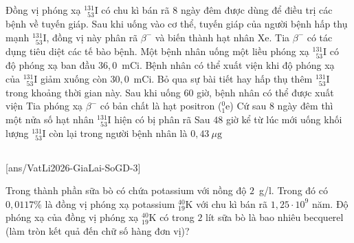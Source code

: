 	\begin{ex}%
		Đồng vị phóng xạ ${}^{131}_{\phantom{1}53}\text{I}$ có chu kì bán rã $8$ ngày đêm được dùng để điều trị các bệnh về tuyến giáp. Sau khi uống vào cơ thể, tuyến giáp của người bệnh hấp thụ mạnh ${}^{131}_{\phantom{1}53}\text{I}$, đồng vị này phân rã $\beta^-$ và biến thành hạt nhân Xe. Tia $\beta^-$ có tác dụng tiêu diệt các tế bào bệnh. Một bệnh nhân uống một liều phóng xạ ${}^{131}_{\phantom{1}53}\text{I}$ có độ phóng xạ ban đầu $36{,}0$~mCi. Bệnh nhân có thể xuất viện khi độ phóng xạ của ${}^{131}_{\phantom{1}53}\text{I}$ giảm xuống còn $30{,}0$~mCi. Bỏ qua sự bài tiết hay hấp thụ thêm ${}^{131}_{\phantom{1}53}\text{I}$ trong khoảng thời gian này.
		\choiceTFt
		{\True Sau khi uống $60$ giờ, bệnh nhân có thể được xuất viện}
		{Tia phóng xạ $\beta^-$ có bản chất là hạt positron (${}^0_1\text{e}$)}
		{\True Cứ sau $8$ ngày đêm thì một nửa số hạt nhân ${}^{131}_{\phantom{1}53}\text{I}$ hiện có bị phân rã}
		{Sau $48$ giờ kể từ lúc mới uống khối lượng ${}^{131}_{\phantom{1}53}\text{I}$ còn lại trong người bệnh nhân là $0{,}43~\mu\text{g}$}
	\end{ex}

	\subsection*{}
	\setcounter{ex}{0}
	[ans/VatLi2026-GiaLai-SoGD-3]

	\begin{ex}%
		Trong thành phần sữa bò có chứa potassium với nồng độ $2$~g/l. Trong đó có $0{,}0117\%$ là đồng vị phóng xạ potassium ${}^{40}_{19}\text{K}$ với chu kì bán rã $1{,}25\cdot 10^9$ năm. Độ phóng xạ của đồng vị phóng xạ ${}^{40}_{19}\text{K}$ có trong $2$ lít sữa bò là bao nhiêu becquerel (làm tròn kết quả đến chữ số hàng đơn vị)?
		\par
	\end{ex}

